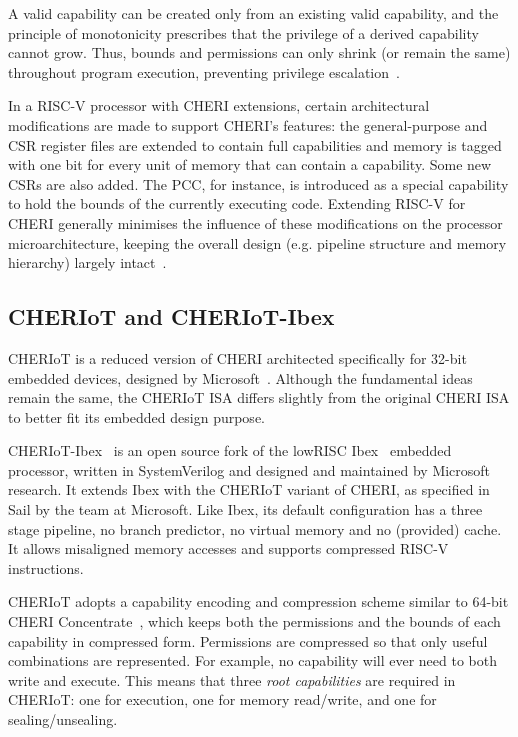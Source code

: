 \documentclass[10pt,conference]{IEEEtran}
\begin{document}
A valid capability can be created only from an existing valid capability,
and the principle of monotonicity prescribes that the privilege of a
derived capability cannot grow. Thus, bounds and permissions can only
shrink (or remain the same) throughout program execution, preventing
privilege escalation~\cite{cheriisav9}.

In a RISC-V processor with CHERI extensions, certain architectural
modifications are made to support CHERI's features: the general-purpose and CSR
register files are extended to contain full capabilities and memory is tagged
with one bit for every unit of memory that can contain a capability.
Some new CSRs are also added. The PCC, for instance, is
introduced as a special capability to hold the bounds of the currently
executing code.  Extending RISC-V for CHERI generally minimises the
influence of these modifications on the processor microarchitecture,
keeping the overall design (e.g. pipeline structure and memory hierarchy) largely
intact~\cite{introduction-to-cheri}.

\subsection{CHERIoT and CHERIoT-Ibex}\label{sec:corr}

CHERIoT is a reduced version of CHERI architected specifically for 32-bit embedded
devices, designed by Microsoft~\cite{amar2023cheriot}.  Although the
fundamental ideas remain the same, the CHERIoT ISA differs slightly from the
original CHERI ISA to better fit its embedded design purpose.

CHERIoT-Ibex~\cite{cheriot-ibex} is an open source fork of the lowRISC Ibex~\cite{ibex}
embedded processor, written in SystemVerilog and designed and maintained by
Microsoft research. It extends Ibex with the CHERIoT variant of CHERI, as
specified in Sail by the team at Microsoft. Like Ibex, its default
configuration has a three stage pipeline, no branch predictor, no virtual
memory and no (provided) cache. It allows misaligned memory accesses and
supports compressed RISC-V instructions. 

CHERIoT adopts a capability encoding and compression scheme similar to
64-bit CHERI Concentrate~\cite{CHERIConcentrate}, which keeps both the
permissions and the bounds of each capability in compressed
form. Permissions are compressed so that only useful combinations are
represented. For example, no capability will ever need to both write and
execute. This means that three \textit{root capabilities} are required in
CHERIoT: one for execution, one for memory read/write, and one for
sealing/unsealing.
\end{document}
